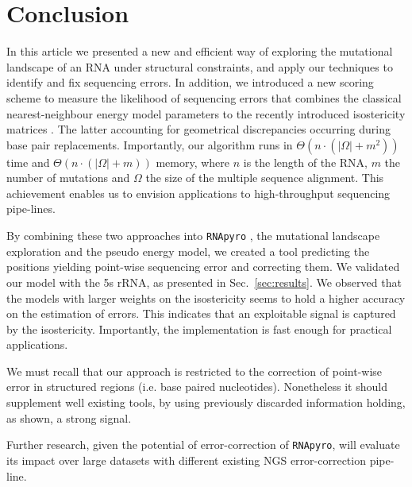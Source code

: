 \section{Conclusion}
\label{sec:conclusion}

In this article we presented a new and efficient way of exploring the mutational landscape of an RNA under structural constraints,
and apply our techniques to identify and fix sequencing errors. In addition, we introduced a new scoring scheme to measure the
likelihood of sequencing errors that combines the classical nearest-neighbour energy model parameters \cite{Turner2010} to the recently introduced
isostericity matrices \cite{Stombaugh2009}. The latter accounting for geometrical discrepancies occurring during base pair replacements.
Importantly, our algorithm runs in  $\Theta(n\cdot(|\Omega|+m^2))$ time and $\Theta(n\cdot(|\Omega|+m))$ memory, where $n$ is the length of the RNA,
$m$ the number of mutations and $\Omega$ the size of the multiple sequence alignment. This achievement enables us to envision applications to high-throughput sequencing pipe-lines.


By combining these two approaches into \texttt{RNApyro} ,  the 
mutational landscape exploration and the pseudo energy model,
 we created a tool predicting the positions
 yielding point-wise sequencing error and correcting them.
We validated our model with the 5s rRNA,
as presented in Sec.~\ref{sec:results}.
We observed that the models
with larger weights on the
isostericity seems to hold a higher accuracy on the estimation of errors.
This indicates that an exploitable signal is captured by the isostericity.
Importantly, the implementation is fast enough for practical applications. 


We must recall that our approach is restricted to
 the correction of point-wise error in structured regions (i.e. base paired nucleotides).
 Nonetheless it should supplement well existing tools, by using previously discarded
information holding, as shown, a strong signal.

Further research, given the potential of error-correction of \texttt{RNApyro}, 
will evaluate its impact over large datasets with different existing
  NGS error-correction pipe-line.